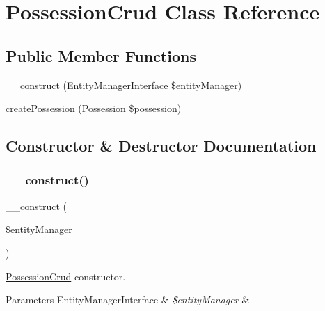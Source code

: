 \hypertarget{class_app_1_1_d_a_l_1_1_possession_crud}{}\section{Possession\+Crud Class Reference}
\label{class_app_1_1_d_a_l_1_1_possession_crud}
\subsection*{Public Member Functions}
\begin{DoxyCompactItemize}
\item 
\mbox{\hyperlink{class_app_1_1_d_a_l_1_1_possession_crud_abb5fb9a65dd8a81e7482dddbf71c5177}{\+\_\+\+\_\+construct}} (Entity\+Manager\+Interface \$entity\+Manager)
\item 
\mbox{\hyperlink{class_app_1_1_d_a_l_1_1_possession_crud_aa2e3ba64b213833917fd22ec423de8eb}{create\+Possession}} (\mbox{\hyperlink{class_app_1_1_entity_1_1_possession}{Possession}} \$possession)
\end{DoxyCompactItemize}


\subsection{Constructor \& Destructor Documentation}
\mbox{\label{class_app_1_1_d_a_l_1_1_possession_crud_abb5fb9a65dd8a81e7482dddbf71c5177}} 
\subsubsection{\texorpdfstring{\_\_construct()}{\_\_construct()}}
{\footnotesize\ttfamily \+\_\+\+\_\+construct (\begin{DoxyParamCaption}\item[{Entity\+Manager\+Interface}]{\$entity\+Manager }\end{DoxyParamCaption})}

\mbox{\hyperlink{class_app_1_1_d_a_l_1_1_possession_crud}{Possession\+Crud}} constructor. 
\begin{DoxyParams}[1]{Parameters}
Entity\+Manager\+Interface & {\em \$entity\+Manager} & \\
\hline
\end{DoxyParams}


